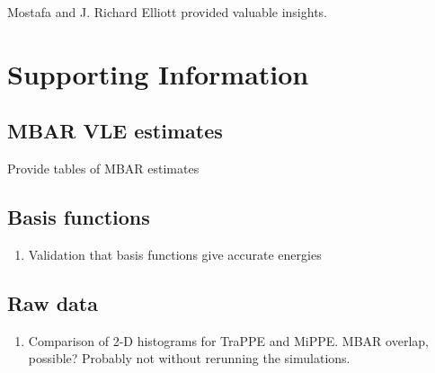\documentclass[journal=jced,manuscript=article]{achemso}
\begin{document}
Mostafa and J. Richard Elliott provided valuable insights.



\section{Supporting Information}

\subsection{MBAR VLE estimates}

Provide tables of MBAR estimates

\subsection{Basis functions}

\begin{enumerate}
	\item Validation that basis functions give accurate energies
\end{enumerate}

\subsection{Raw data}

\begin{enumerate}
	\item Comparison of 2-D histograms for TraPPE and MiPPE. MBAR overlap, possible? Probably not without rerunning the simulations.
\end{enumerate}
\end{document}
